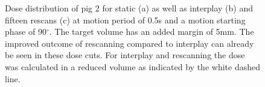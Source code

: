 \begin{figure}[H]
\begin{center}
{ }
\caption{Dose distribution of pig 2 for static (a) as well as interplay (b) and fifteen rescans (c) at motion period of 0.5s and a motion 
starting phase of 90$^{\circ}$. The target volume has an added margin of 5mm. The improved outcome of rescanning compared to interplay 
can already be seen in these dose cuts. For interplay and rescanning the dose was calculated in a reduced volume as indicated by the white 
dashed line.}
\label{dose_pig2}
 \end{center}
\end{figure}

\newpage

